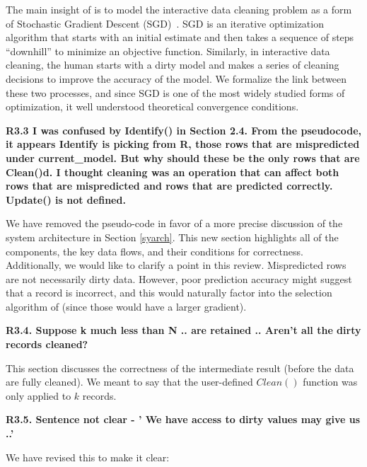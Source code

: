 The main insight of \sys is to model the interactive data cleaning problem as a form of Stochastic Gradient Descent (SGD)~\cite{bottou2012stochastic}.
SGD is an iterative optimization algorithm that starts with an initial estimate and then takes a sequence of steps ``downhill'' to minimize an objective function.
Similarly, in interactive data cleaning, the human starts with a dirty model and makes a series of cleaning decisions to improve the accuracy of the model.
We formalize the link between these two processes, and since SGD is one of the most widely studied forms of optimization, it well understood theoretical convergence conditions.


\vspace{0.5em}

\noindent \textbf{R3.3 I was confused by Identify() in Section 2.4.
From the pseudocode, it appears Identify is picking from R,
those rows that are mispredicted under current\_model.
But why should these be the only rows that are Clean()d.
I thought cleaning was an operation that can
affect both rows that are mispredicted and rows that
are predicted correctly. Update() is not defined.}

\noindent  We have removed the pseudo-code in favor of a more precise discussion of the system architecture in Section \ref{syarch}. This new section highlights all of the components, the key data flows, and their conditions for correctness. 
Additionally, we would like to clarify a point in this review. 
Mispredicted rows are not necessarily dirty data. 
However, poor prediction accuracy might suggest that a record is incorrect, and this would naturally factor into the selection algorithm of \sys (since those would have a larger gradient).

\vspace{0.5em}

\noindent \textbf{R3.4. Suppose k much less than N .. are retained .. Aren't all
the dirty records cleaned?}

\noindent This section discusses the correctness of the intermediate result (before the data are fully cleaned).
We meant to say that the user-defined $Clean()$ function was only applied to $k$ records.

\vspace{0.5em}

\noindent\textbf{R3.5. Sentence not clear - ' We have access to dirty
values may give us ..'}

 \noindent We have revised this to make it clear:

